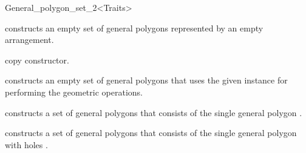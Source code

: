 \begin{ccRefClass}{General_polygon_set_2<Traits>}

\ccCreation
{}

\ccThreeToTwo
    
  {constructs an empty set of general polygons represented by an
  empty arrangement.}
    
  {copy constructor.}
        
  {constructs an empty set of general polygons that uses the given
   instance for performing the geometric operations.}

  {constructs a set of general polygons that consists of the single general 
   polygon .}

  {constructs a set of general polygons that consists of the single
   general polygon with holes .}

%   

\ccAccessFunctions
\ccThreeToTwo


\end{ccRefClass}
